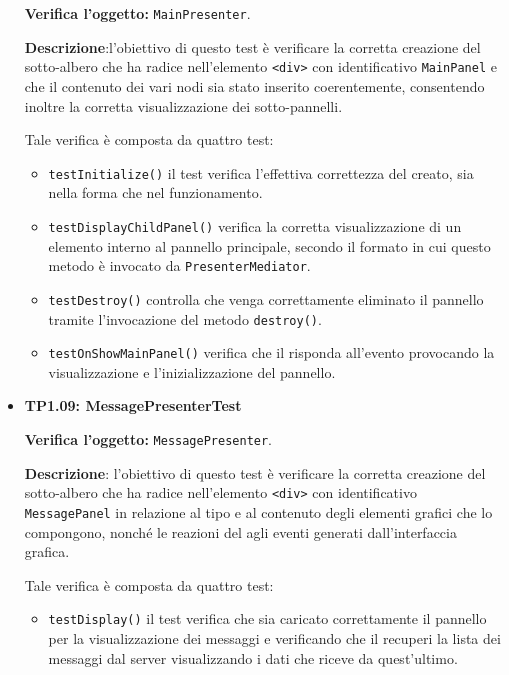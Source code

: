 \begin{itemize}
\textbf{Verifica l'oggetto:} \texttt{MainPresenter}.

\textbf{Descrizione}:l'obiettivo di questo test è verificare la corretta creazione del sotto-albero che ha radice nell'elemento \verb'<div>' con identificativo \verb'MainPanel' e che il contenuto dei vari nodi sia stato inserito coerentemente, consentendo inoltre la corretta visualizzazione dei sotto-pannelli.

Tale verifica è composta da quattro test:
\begin{itemize}

\item \texttt{testInitialize()} il test verifica l'effettiva correttezza del  creato, sia nella forma che nel funzionamento.

\item \texttt{testDisplayChildPanel()} verifica la corretta visualizzazione di un elemento interno al pannello principale, secondo il formato in cui questo metodo è invocato da \texttt{PresenterMediator}.

\item \texttt{testDestroy()} controlla che venga correttamente eliminato il pannello tramite l'invocazione del metodo \verb'destroy()'.

\item \texttt{testOnShowMainPanel()} verifica che il  risponda all'evento provocando la visualizzazione e l'inizializzazione del pannello.

\end{itemize}

\item[\passed] \textbf{TP1.09: MessagePresenterTest}

\textbf{Verifica l'oggetto:} \texttt{MessagePresenter}.

\textbf{Descrizione}: l'obiettivo di questo test è verificare la corretta creazione del sotto-albero che ha radice nell'elemento \verb'<div>' con identificativo \texttt{MessagePanel} in relazione al tipo e al contenuto degli elementi grafici che lo compongono, nonché le reazioni del  agli eventi generati dall'interfaccia grafica.

Tale verifica è composta da quattro test:
\begin{itemize}

\item \texttt{testDisplay()} il test verifica che sia caricato correttamente il pannello per la visualizzazione dei messaggi  e verificando che il  recuperi la lista dei messaggi dal server visualizzando i dati che riceve da quest'ultimo.


\end{itemize}
\end{itemize}
